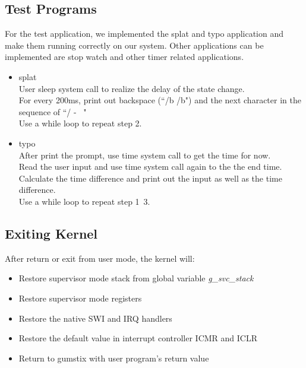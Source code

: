 \documentclass{article}
\begin{document}
\subsection{Test Programs}
For the test application, we implemented the splat and typo application and make them running correctly on our system. Other applications can be implemented are stop watch and other timer related applications. 
\begin{itemize}
\item{splat}\\
	\newline
	User sleep system call to realize the delay of the state change.\\
	For every 200ms, print out backspace (``/b /b") and the next character in the sequence of ``/ - \ "\\
	Use a while loop to repeat step 2.
\item{typo}\\
	\newline
	After print the prompt, use time system call to get the time for now.\\
	Read the user input and use time system call again to the the end time.\\
	Calculate the time difference and print out the input as well as the time difference.\\
	Use a while loop to repeat step 1~3. 	
\end{itemize}

\subsection{Exiting Kernel}
	After return or exit from user mode, the kernel will:
	\begin{itemize}
	  \setlength{\itemsep}{1pt}
	  \setlength{\parskip}{0pt}
	  \setlength{\parsep}{0pt}

	\item Restore supervisor mode stack from global variable {\it g\_svc\_stack}
	\item Restore supervisor mode registers
	\item Restore the native SWI and IRQ handlers
	\item Restore the default value in interrupt controller ICMR and ICLR
	\item Return to gumstix with user program's return value
	\end{itemize}
	
 
\end{document}
